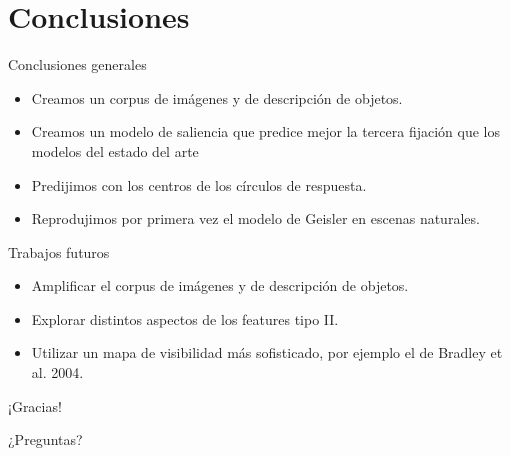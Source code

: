 \documentclass[compress]{beamer}
\begin{document}
\section{Conclusiones}
\begin{frame}{Conclusiones generales}
\begin{itemize}
\item Creamos un corpus de imágenes y de descripción de objetos.
\item Creamos un modelo de saliencia que predice mejor la tercera fijación que los modelos del estado del arte
\item Predijimos con los centros de los círculos de respuesta.
\item Reprodujimos por primera vez el modelo de Geisler en escenas naturales.
\end{itemize}
\end{frame}

\begin{frame}{Trabajos futuros}
\begin{itemize}
\item Amplificar el corpus de imágenes y de descripción de objetos.
\item Explorar distintos aspectos de los features tipo II.
\item Utilizar un mapa de visibilidad más sofisticado, por ejemplo el de Bradley et al. 2004.
\end{itemize}
\end{frame}

\begin{frame}
\begin{center}
\Huge ¡Gracias!

\bigskip

\huge ¿Preguntas?
\end{center}
\end{frame}
\end{document}
